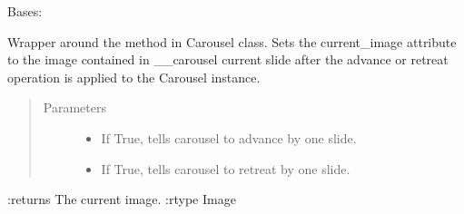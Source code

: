 \documentclass[letterpaper,10pt,english]{sphinxmanual}
\begin{document}
\begin{fulllineitems}
\label{\detokenize{polo.widgets:polo.widgets.slideshow_viewer.SlideshowViewer}}
Bases: {\hyperref[\detokenize{polo.widgets:polo.widgets.slideshow_viewer.PhotoViewer}]{}}

\begin{fulllineitems}
\label{\detokenize{polo.widgets:polo.widgets.slideshow_viewer.SlideshowViewer.carousel_controls}}
Wrapper around the method  in Carousel class. Sets the
current\_image attribute to the image contained in \_\_carousel
current slide after the advance or retreat operation is applied to
the Carousel instance.
\begin{quote}\begin{description}
\item[{Parameters}] \leavevmode\begin{itemize}
\item {} 
 \textendash{} If True, tells carousel to advance by one slide.

\item {} 
 \textendash{} If True, tells carousel to retreat by one slide.

\end{itemize}

\end{description}\end{quote}

:returns The current image.
:rtype Image

\end{fulllineitems}


\end{fulllineitems}
\end{document}
